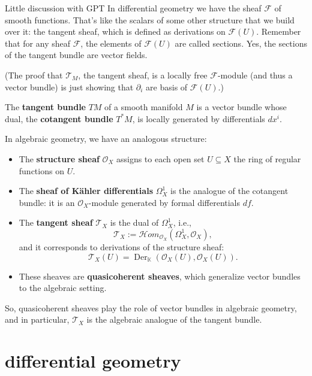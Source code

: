 \begin{thing6}{Little discussion with GPT}\leavevmode
In differential geometry we have the sheaf \(\mathcal{F}\) of smooth functions. That's like the scalars of some other structure that we build over it: the tangent sheaf, which is defined as derivations on \(\mathcal{F}(U)\). Remember that for any sheaf \(\mathcal{F}\), the elements of \(\mathcal{F}(U)\) are called sections. Yes, the sections of the tangent bundle are vector fields.

(The proof that \(\mathcal{T}_M\), the tangent sheaf, is a locally free \(\mathcal{F}\)-module (and thus a vector bundle) is just showing that \(\partial_i\) are basis of \(\mathcal{F}(U)\).)

The \textbf{tangent bundle} $TM$ of a smooth manifold $M$ is a vector bundle whose dual, the \textbf{cotangent bundle} $T^*M$, is locally generated by differentials $dx^i$.

	In algebraic geometry, we have an analogous structure:

\begin{itemize}
  \item The \textbf{structure sheaf} $\mathcal{O}_X$ assigns to each open set $U \subseteq X$ the ring of regular functions on $U$.
  \item The \textbf{sheaf of Kähler differentials} $\Omega^1_X$ is the analogue of the cotangent bundle: it is an $\mathcal{O}_X$-module generated by formal differentials $df$.
  \item The \textbf{tangent sheaf} $\mathcal{T}_X$ is the dual of $\Omega^1_X$, i.e.,
  \[
  \mathcal{T}_X := \mathcal{H}om_{\mathcal{O}_X}(\Omega^1_X, \mathcal{O}_X),
  \]
  and it corresponds to derivations of the structure sheaf:
  \[
  \mathcal{T}_X(U) = \operatorname{Der}_{\mathbb{K}}(\mathcal{O}_X(U), \mathcal{O}_X(U)).
  \]
  \item These sheaves are \textbf{quasicoherent sheaves}, which generalize vector bundles to the algebraic setting.
\end{itemize}

So, quasicoherent sheaves play the role of vector bundles in algebraic geometry, and in particular, $\mathcal{T}_X$ is the algebraic analogue of the tangent bundle.
\end{thing6}

\section{differential geometry}

